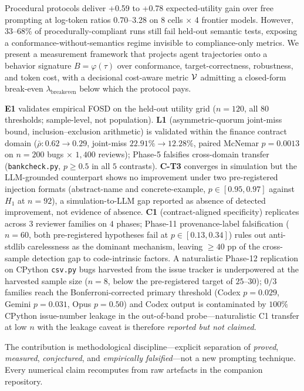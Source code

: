 Procedural protocols deliver +0.59 to +0.78 expected-utility gain over free prompting at log-token ratios 0.70--3.28 on 8 cells $\times$ 4 frontier models. However, 33--68\% of procedurally-compliant runs still fail held-out semantic tests, exposing a conformance-without-semantics regime invisible to compliance-only metrics. We present a measurement framework that projects agent trajectories onto a behavior signature $B = \varphi(\tau)$ over conformance, target-correctness, robustness, and token cost, with a decisional cost-aware metric $\mathcal{V}$ admitting a closed-form break-even $\lambda_{\mathrm{breakeven}}$ below which the protocol pays.

\textbf{E1} validates empirical FOSD on the held-out utility grid ($n = 120$, all $80$ thresholds; sample-level, not population). \textbf{L1} (asymmetric-quorum joint-miss bound, inclusion--exclusion arithmetic) is validated within the finance contract domain ($\bar{\rho}: 0.62 \to 0.29$, joint-miss $22.91\% \to 12.28\%$, paired McNemar $p = 0.0013$ on $n = 200$ bugs $\times$ $1{,}400$ reviews); Phase-5 falsifies cross-domain transfer (\texttt{bankcheck.py}, $p \ge 0.5$ in all $5$ contrasts). \textbf{C-T3} converges in simulation but the LLM-grounded counterpart shows no improvement under two pre-registered injection formats (abstract-name and concrete-example, $p \in [0.95, 0.97]$ against $H_1$ at $n=92$), a simulation-to-LLM gap reported as absence of detected improvement, not evidence of absence. \textbf{C1} (contract-aligned specificity) replicates across $3$ reviewer families on $4$ phases; Phase-11 provenance-label falsification ($n=60$, both pre-registered hypotheses fail at $p \in [0.13, 0.34]$) rules out anti-stdlib carelessness as the dominant mechanism, leaving $\ge 40$ pp of the cross-sample detection gap to code-intrinsic factors. A naturalistic Phase-12 replication on CPython \texttt{csv.py} bugs harvested from the issue tracker is underpowered at the harvested sample size ($n = 8$, below the pre-registered target of $25$--$30$); $0/3$ families reach the Bonferroni-corrected primary threshold (Codex $p = 0.029$, Gemini $p = 0.031$, Opus $p = 0.50$) and Codex output is contaminated by $100\%$ CPython issue-number leakage in the out-of-band probe---naturalistic C1 transfer at low $n$ with the leakage caveat is therefore \emph{reported but not claimed}.

The contribution is methodological discipline---explicit separation of \emph{proved}, \emph{measured}, \emph{conjectured}, and \emph{empirically falsified}---not a new prompting technique. Every numerical claim recomputes from raw artefacts in the companion repository.
